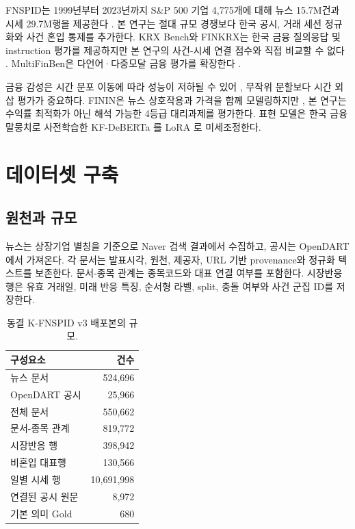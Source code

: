\documentclass[10pt,a4paper,twocolumn]{article}
\newcommand{\dataset}{K-FNSPID v3}
\begin{document}
FNSPID는 1999년부터 2023년까지 S\&P 500 기업 4,775개에 대해 뉴스 15.7M건과 시세 29.7M행을 제공한다 \cite{dong-etal-2024-fnspid}. 본 연구는 절대 규모 경쟁보다 한국 공시, 거래 세션 정규화와 사건 혼입 통제를 추가한다. KRX Bench와 FINKRX는 한국 금융 질의응답 및 instruction 평가를 제공하지만 본 연구의 사건-시세 연결 점수와 직접 비교할 수 없다 \cite{son-etal-2024-krx,son-etal-2025-finkrx}. MultiFinBen은 다언어·다중모달 금융 평가를 확장한다 \cite{peng-etal-2026-multifinben}.

금융 감성은 시간 분포 이동에 따라 성능이 저하될 수 있어 \cite{guo-etal-2023-predict}, 무작위 분할보다 시간 외삽 평가가 중요하다. FININ은 뉴스 상호작용과 가격을 함께 모델링하지만 \cite{wang-etal-2024-modeling}, 본 연구는 수익률 최적화가 아닌 해석 가능한 4등급 대리과제를 평가한다. 표현 모델은 한국 금융 말뭉치로 사전학습한 KF-DeBERTa \cite{jeon-etal-2023-kfdeberta}를 LoRA \cite{hu-etal-2022-lora}로 미세조정한다.

\section{데이터셋 구축}

\subsection{원천과 규모}

뉴스는 상장기업 별칭을 기준으로 Naver 검색 결과에서 수집하고, 공시는 OpenDART에서 가져온다. 각 문서는 발표시각, 원천, 제공자, URL 기반 provenance와 정규화 텍스트를 보존한다. 문서-종목 관계는 종목코드와 대표 연결 여부를 포함한다. 시장반응 행은 유효 거래일, 미래 반응 특징, 순서형 라벨, split, 충돌 여부와 사건 군집 ID를 저장한다.

\begin{table}[t]
\centering
\small
\begin{tabular}{lr}
\toprule
구성요소 & 건수 \\
\midrule
뉴스 문서 & 524,696 \\
OpenDART 공시 & 25,966 \\
전체 문서 & 550,662 \\
문서-종목 관계 & 819,772 \\
시장반응 행 & 398,942 \\
비혼입 대표행 & 130,566 \\
일별 시세 행 & 10,691,998 \\
연결된 공시 원문 & 8,972 \\
기본 의미 Gold & 680 \\
\bottomrule
\end{tabular}
\caption{동결 \dataset{} 배포본의 규모.}
\label{tab:scale-ko}
\end{table}
\end{document}
